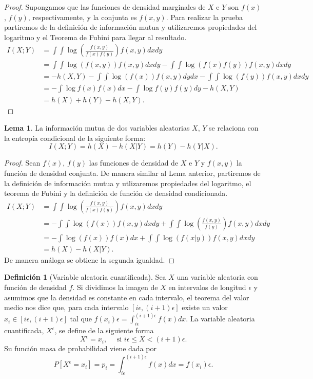 \documentclass[10pt,a4paper]{article} %
\theoremstyle{definition}
\newtheorem{definition}{Definición}[section]
\newtheorem{lemma}[theorem]{Lema}
\begin{document}
\begin{proof}
  Supongamos que las funciones de densidad marginales de $X$ e $Y$ son $f(x)$, $f(y)$, respectivamente, y la conjunta es $f(x,y)$.
  Para realizar la prueba partiremos de la definición de información mutua y utilizaremos propiedades del logaritmo y el Teorema de Fubini para llegar al resultado.
  \begin{align*}
    I(X;Y) &= \int \int  \log \left(\frac{f(x,y)}{f(x)f(y)}\right)f(x,y)dxdy \\
    &= \int \int  \log \left(f(x,y)\right)f(x,y)dxdy - \int \int  \log \left(f(x)f(y)\right) f(x,y)dxdy\\
    &= -h(X,Y)-\int\int \log \left(f(x)\right)f(x,y)  dy dx - \int \int \log \left(f(y)\right)f(x,y)dxdy\\
    &= -\int  \log f(x)f(x)dx - \int \log f(y) f(y)dy -h(X,Y)\\
    &= h(X) + h(Y) - h(X,Y).
  \end{align*}
\end{proof}

\begin{lemma}
  La información mutua de dos variables aleatorias $X$, $Y$ se relaciona con la entropía condicional de la siguiente forma:\[
I(X;Y) = h(X) - h(X|Y) = h(Y) - h(Y|X).
  \]
\end{lemma}

\begin{proof}
  Sean $f(x)$, $f(y)$ las funciones de densidad de $X$ e $Y$ y $f(x,y)$ la función de densidad conjunta.
  De manera similar al Lema anterior, partiremos de la definición de información mutua y utlizaremos propiedades del logaritmo, el teorema de Fubini y la definición de función de densidad condicionada.
  \begin{align*}
    I(X;Y)&= \int \int  \log\left( \frac{f(x,y)}{f(x)f(y)}\right)f(x,y)dxdy \\
    &= - \int\int \log \left(f(x)\right)f(x,y)  dx dy + \int\int\log \left(\frac{f(x,y)}{f(y)}\right)  f(x,y)dx dy\\
    &= - \int  \log \left(f(x)\right)f(x) dx + \int\int \log \left(f(x|y)\right)f(x,y) dx dy\\  
    &= h(X) - h(X|Y).
  \end{align*}
De manera análoga se obtiene la segunda igualdad.
\end{proof}

\begin{definition}[Variable aleatoria cuantificada]
  Sea $X$ una variable aleatoria con función de densidad $f$. Si dividimos la imagen de $X$ en intervalos de longitud $\epsilon$ y asumimos que la densidad es constante en cada intervalo, el teorema del valor medio nos dice que, para cada intervalo $\left[i\epsilon, (i+1)\epsilon\right]$ existe un valor $x_i\in \left[i\epsilon, (i+1)\epsilon\right]$ tal que $f(x_i)\epsilon = \int_{i\epsilon}^{(i+1)\epsilon}f(x)dx$.
  La variable aleatoria cuantificada, $X^{\epsilon}$, se define de la siguiente forma\[
X^{\epsilon} = x_i, \quad \text{ si } i\epsilon \leq X  < (i+1)\epsilon.
\]Su función masa de probabilidad viene dada por \[
P[X^\epsilon = x_i] = p_i =  \int_{i\epsilon}^{(i+1)\epsilon}f(x)dx = f(x_i)\epsilon.
\]
\end{definition}
\end{document}
